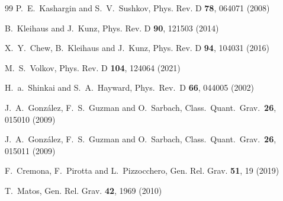 \documentclass[floats,floatfix,showpacs,amssymb,prd,superscriptaddress,nofootinbib,nolongbibliography,reprint]{revtex4-2}
\begin{document}
\begin{thebibliography}{99}
P.~E.~Kashargin and S.~V.~Sushkov,
Phys. Rev. D \textbf{78}, 064071 (2008)

B.~Kleihaus and J.~Kunz,
Phys. Rev. D \textbf{90}, 121503 (2014)

X.~Y.~Chew, B.~Kleihaus and J.~Kunz,
Phys. Rev. D \textbf{94}, 104031 (2016)

M.~S.~Volkov,
Phys. Rev. D \textbf{104}, 124064 (2021)

  H.~a.~Shinkai and S.~A.~Hayward,
  Phys.\ Rev.\ D {\bf 66}, 044005 (2002)

  J.~A.~Gonz\'alez, F.~S.~Guzman and O.~Sarbach,
  Class.\ Quant.\ Grav.\  {\bf 26}, 015010 (2009)

  J.~A.~Gonz\'alez, F.~S.~Guzman and O.~Sarbach,
  Class.\ Quant.\ Grav.\  {\bf 26},  015011 (2009)

F.~Cremona, F.~Pirotta and L.~Pizzocchero,
Gen. Rel. Grav. \textbf{51}, 19 (2019)
 
T.~Matos,
Gen. Rel. Grav. \textbf{42}, 1969 (2010)


\end{thebibliography}
\end{document}
